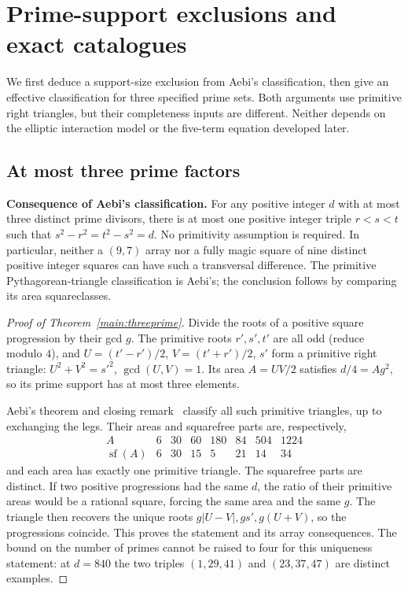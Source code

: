 \section{Prime-support exclusions and exact catalogues}\label{sec:smoothsupport}

We first deduce a support-size exclusion from Aebi's classification, then
give an effective classification for three specified prime sets. Both
arguments use primitive right triangles, but their completeness inputs
are different. Neither depends on the elliptic interaction model or the
five-term equation developed later.

\subsection{At most three prime factors}\label{sec:threeprime}

\begin{theorem}\label{main:threeprime}
\textbf{Consequence of Aebi's classification.} For any positive integer
$d$ with at most three distinct prime divisors, there is at most one
positive integer triple $r<s<t$ such that
$s^2-r^2=t^2-s^2=d$. No primitivity assumption is required. In particular,
neither a $(9,7)$ array nor a fully magic square of nine distinct positive
integer squares can have such a transversal difference. The primitive
Pythagorean-triangle classification is Aebi's; the conclusion follows by
comparing its area squareclasses.
\end{theorem}

\begin{proof}[Proof of Theorem~\ref{main:threeprime}]
Divide the roots of a positive square progression by their gcd $g$.
The primitive roots $r',s',t'$ are all odd (reduce modulo $4$), and
$U=(t'-r')/2$, $V=(t'+r')/2$, $s'$ form a primitive right triangle:
$U^2+V^2=s'^2$, $\gcd(U,V)=1$. Its area $A=UV/2$ satisfies
$d/4=Ag^2$, so its prime support has at most three elements.

Aebi's theorem and closing remark~\cite{AEB26} classify all such
primitive triangles, up to exchanging the legs. Their areas and
squarefree parts are, respectively,
\[
\begin{array}{c|rrrrrrr}
A&6&30&60&180&84&504&1224\\\hline
\operatorname{sf}(A)&6&30&15&5&21&14&34
\end{array}
\]
and each area has exactly one primitive triangle. The squarefree parts
are distinct. If two positive progressions had the same $d$, the ratio
of their primitive areas would be a rational square, forcing the same
area and the same $g$. The triangle then recovers the unique roots
$g|U-V|,gs',g(U+V)$, so the progressions coincide. This proves the
statement and its array consequences. The bound on the number of primes
cannot be raised to four for this uniqueness statement: at $d=840$ the
two triples $(1,29,41)$ and $(23,37,47)$ are distinct examples.
\end{proof}
